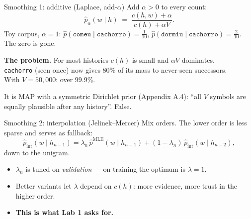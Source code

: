 \documentclass[11pt,aspectratio=169]{beamer}
\begin{document}
\begin{frame}{Smoothing 1: additive (Laplace, add-$\alpha$)}
  Add $\alpha > 0$ to every count:
  \[
    \hat p_\alpha(w\mid h) \;=\; \frac{c(h,w)+\alpha}{c(h)+\alpha V} .
  \]
  Toy corpus, $\alpha = 1$: $\hat p(\texttt{comeu}\mid\texttt{cachorro}) = \frac{1}{10}$,
  $\hat p(\texttt{dormiu}\mid\texttt{cachorro}) = \frac{2}{10}$. The zero is gone.

  \vspace{0.8em}
  \textbf{The problem.} For most histories $c(h)$ is small and $\alpha V$ dominates.\\
  \texttt{cachorro} (seen once) now gives 80\% of its mass to never-seen successors.\\
  With $V = 50{,}000$: over 99.9\%.

  \vspace{0.6em}
  It is MAP with a symmetric Dirichlet prior (Appendix A.4): ``all $V$ symbols are equally
  plausible after any history''. False.
\end{frame}

\begin{frame}{Smoothing 2: interpolation (Jelinek--Mercer)}
  Mix orders. The lower order is less sparse and serves as fallback:
  \[
    \hat p_{\text{int}}(w\mid h_{n-1}) = \lambda_n\,\hat p^{\text{MLE}}(w\mid h_{n-1})
    + (1-\lambda_n)\,\hat p_{\text{int}}(w\mid h_{n-2}),
  \]
  down to the unigram.

  \vspace{0.8em}
  \begin{itemize}
    \item $\lambda_n$ is tuned on \emph{validation} --- on training the optimum is
          $\lambda = 1$.
    \item Better variants let $\lambda$ depend on $c(h)$: more evidence, more trust in the
          higher order.
    \item \textbf{This is what Lab 1 asks for.}
  \end{itemize}
\end{frame}
\end{document}
